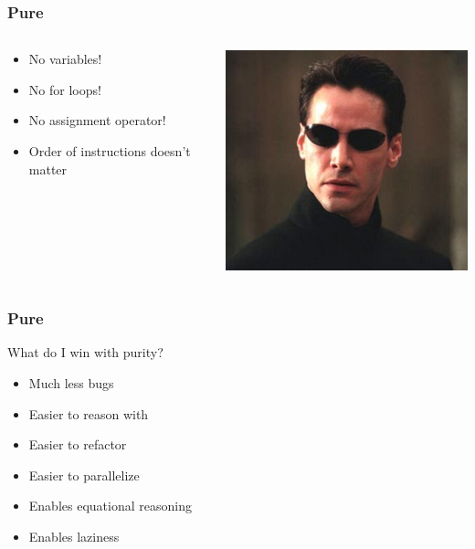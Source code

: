 \documentclass{beamer}
\begin{document}
\begin{frame}
\frametitle{Pure}

 \begin{columns}[]
  \begin{column}[]{5cm}
   \begin{itemize}
    \item No variables!
    \item No for loops!
    \item No assignment operator!
    \item Order of instructions doesn't matter
   \end{itemize}
  \end{column}
  \begin{column}[]{5cm}
    \includegraphics[width=0.7\linewidth]{figs/neo}
  \end{column}
 \end{columns}
 \vspace{0.5cm}
 
\end{frame}

\begin{frame}
\frametitle{Pure}

What do I win with purity?
 \begin{itemize}
  \item Much less bugs
  \item Easier to reason with
  \item Easier to refactor
  \item Easier to parallelize
  \item Enables equational reasoning
  \item Enables laziness
 \end{itemize}

 
\end{frame}
\end{document}
